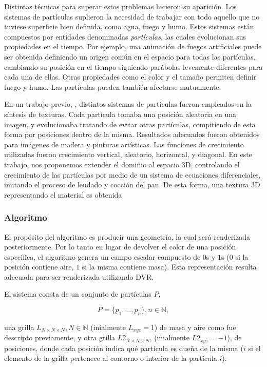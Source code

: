 \documentclass[oneside,a4paper,spanish,links]{amca}
\begin{document}
Distintas t\'ecnicas para superar estos problemas hicieron su aparici\'on. Los sistemas de part\'iculas \citep{Reeves83} suplieron la necesidad de trabajar con todo aquello que no tuviese superficie bien definida, como agua, fuego y humo. Estos sistemas est\'an compuestos por entidades denominadas {\em part\'iculas}, las cuales evolucionan sus propiedades en el tiempo. Por ejemplo, una animaci\'on de fuegos artificiales puede ser obtenida definiendo un origen com\'un en el espacio para todas las part\'iculas, cambiando su posici\'on en el tiempo siguiendo par\'abolas levemente diferentes para cada una de ellas. Otras propiedades como el color y el tama\~no permiten definir fuego y humo. Las part\'iculas pueden tambi\'en afectarse mutuamente.

En un trabajo previo, \citep{Baravalle2011}, distintos sistemas de part\'iculas fueron empleados en la s\'intesis de texturas. Cada part\'icula tomaba una posici\'on aleatoria en una imagen, y evolucionaba tratando de evitar otras part\'iculas, compitiendo de esta forma por posiciones dentro de la misma. Resultados adecuados fueron obtenidos para im\'agenes de madera y pinturas art\'isticas. Las funciones de crecimiento utilizadas fueron crecimiento vertical, aleatorio, horizontal, y diagonal. En este trabajo, nos proponemos extender el dominio al espacio 3D, controlando el crecimiento de las part\'iculas por medio de un sistema de ecuaciones diferenciales, imitando el proceso de leudado y cocci\'on del pan. De esta forma, una textura 3D representando el material es obtenida


\subsubsection{Algoritmo}

El prop\'osito del algoritmo es producir una geometr\'ia, la cual ser\'a renderizada posteriormente. Por lo tanto en lugar de devolver el color de una posici\'on espec\'ifica, el algoritmo genera un campo escalar compuesto de $0$s y $1$s ($0$ si la posici\'on contiene aire, $1$ si la misma contiene masa). Esta representaci\'on resulta adecuada para ser renderizada utilizando DVR.

El sistema consta de un conjunto de part\'iculas $P$,

\begin{equation}
  P = \{p_{1}, ... , p_{n}\}, n  \in \mathbb{N},
\end{equation}

\noindent una grilla $L_{N\times N \times N}, N \in \mathbb{N} $ (inialmente $L_{xyz}=1$) de masa y aire como fue descripto previamente, y otra grilla $L2_{N\times N \times N}$, (inialmente $L2_{xyz}=-1$), de posiciones, donde cada posici\'on indica qu\'e part\'icula es due\~na de la misma ($i$ si el elemento de la grilla pertenece al contorno o interior de la part\'icula $i$).
\end{document}
